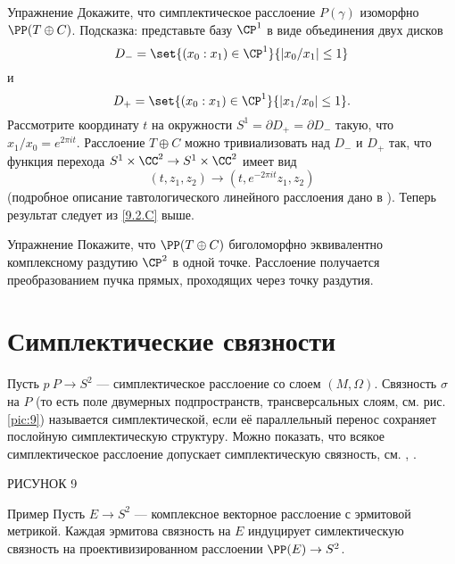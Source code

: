 \begin{thm}{Упражнение}\label{9.2.D}
Докажите, что симплектическое расслоение $P(\gamma)$ изоморфно $\PP(T \oplus C)$.
Подсказка: представьте базу $\CP^1$ в виде объединения двух дисков 
\[D_- = \set{(x_0 : x_1 ) \in \CP^1}{ |x_0 /x_1 | \le 1}\]
и
\[D_+ = \set{(x_0 : x_1 ) \in \CP^1}{|x_1 /x_0 | \le 1}.\]
Рассмотрите координату $t$ на окружности $S^1 = \partial D_+ = \partial D_-$ такую, что $x_1 /x_0 = e^{2\pi it}$.
Расслоение $T \oplus C$ можно тривиализовать над $D_-$ и $D_+$ так, что функция перехода $S^1 \times \CC^2 \to S^1 \times \CC^2$ имеет вид 
\[(t, z_1, z_2 ) \to (t, e^{-2\pi it} z_1, z_2 )\]
(подробное описание тавтологического линейного расслоения дано в \cite{GH}).
Теперь результат следует из \ref{9.2.C} выше.
\end{thm}

\begin{thm}{Упражнение}\label{9.2.E}
Покажите, что $\PP(T \oplus C)$ биголоморфно эквивалентно комплексному раздутию $\CP^2$ в одной точке.
Расслоение получается  преобразованием пучка прямых, проходящих через точку раздутия.
\end{thm}


\section{Симплектические связности}

Пусть $p\: P\to S^2$ --- симплектическое расслоение со слоем $(M,\Omega)$.
Связность $\sigma$ на $P$ (то есть поле двумерных подпространств, трансверсальных слоям, см. рис. \ref{pic:9}) называется симплектической, если её параллельный перенос сохраняет послойную симплектическую структуру.
Можно показать, что всякое симплектическое расслоение допускает симплектическую связность, см. \cite{GLS}, \cite{MS}.

РИСУНОК 9 

\begin{thm*}{Пример}
Пусть $E \to S^2$ --- комплексное векторное расслоение с эрмитовой метрикой.
Каждая эрмитова связность на $E$ индуцирует симлектическую связность на проективизированном расслоении $\PP(E) \to S^2$.
\end{thm*}

